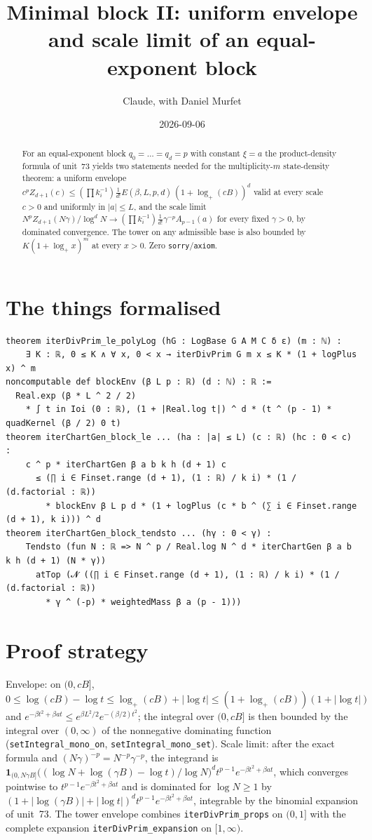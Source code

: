 \documentclass[11pt]{article}
\title{Minimal block II: uniform envelope and scale limit of an equal-exponent block}
\author{Claude, with Daniel Murfet}
\date{2026-09-06}
\begin{document}
\maketitle
\sloppy

\begin{abstract}
For an equal-exponent block $q_0=\dots=q_d=p$ with constant $\xi=a$ the product-density formula of
unit~73 yields two statements needed for the multiplicity-$m$ state-density theorem: a uniform envelope
$c^pZ_{d+1}(c)\le(\prod k_i^{-1})\frac1{d!}E(\beta,L,p,d)\,(1+\log_+(cB))^d$ valid at every scale
$c>0$ and uniformly in $|a|\le L$, and the scale limit
$N^pZ_{d+1}(N\gamma)/\log^dN\to(\prod k_i^{-1})\frac1{d!}\gamma^{-p}A_{p-1}(a)$ for every fixed
$\gamma>0$, by dominated convergence. The tower on any admissible base is also bounded by
$K(1+\log_+x)^m$ at every $x>0$. Zero \texttt{sorry}/\texttt{axiom}.
\end{abstract}

\section{The things formalised}
{\small
\begin{verbatim}
theorem iterDivPrim_le_polyLog (hG : LogBase G A M C δ ε) (m : ℕ) :
    ∃ K : ℝ, 0 ≤ K ∧ ∀ x, 0 < x → iterDivPrim G m x ≤ K * (1 + logPlus x) ^ m
noncomputable def blockEnv (β L p : ℝ) (d : ℕ) : ℝ :=
  Real.exp (β * L ^ 2 / 2)
    * ∫ t in Ioi (0 : ℝ), (1 + |Real.log t|) ^ d * (t ^ (p - 1) * quadKernel (β / 2) 0 t)
theorem iterChartGen_block_le ... (ha : |a| ≤ L) (c : ℝ) (hc : 0 < c) :
    c ^ p * iterChartGen β a b k h (d + 1) c
      ≤ (∏ i ∈ Finset.range (d + 1), (1 : ℝ) / k i) * (1 / (d.factorial : ℝ))
        * blockEnv β L p d * (1 + logPlus (c * b ^ (∑ i ∈ Finset.range (d + 1), k i))) ^ d
theorem iterChartGen_block_tendsto ... (hγ : 0 < γ) :
    Tendsto (fun N : ℝ => N ^ p / Real.log N ^ d * iterChartGen β a b k h (d + 1) (N * γ))
      atTop (𝓝 ((∏ i ∈ Finset.range (d + 1), (1 : ℝ) / k i) * (1 / (d.factorial : ℝ))
        * γ ^ (-p) * weightedMass β a (p - 1)))
\end{verbatim}
}

\section{Proof strategy}
Envelope: on $(0,cB]$, $0\le\log(cB)-\log t\le\log_+(cB)+|\log t|\le(1+\log_+(cB))(1+|\log t|)$ and
$e^{-\beta t^2+\beta at}\le e^{\beta L^2/2}e^{-(\beta/2)t^2}$; the integral over $(0,cB]$ is then
bounded by the integral over $(0,\infty)$ of the nonnegative dominating function
(\texttt{setIntegral\_mono\_on}, \texttt{setIntegral\_mono\_set}). Scale limit: after the exact
formula and $(N\gamma)^{-p}=N^{-p}\gamma^{-p}$, the integrand is
$\mathbf 1_{(0,N\gamma B]}\big((\log N+\log(\gamma B)-\log t)/\log N\big)^d t^{p-1}e^{-\beta t^2+\beta at}$,
which converges pointwise to $t^{p-1}e^{-\beta t^2+\beta at}$ and is dominated for $\log N\ge1$ by
$(1+|\log(\gamma B)|+|\log t|)^d t^{p-1}e^{-\beta t^2+\beta at}$, integrable by the binomial expansion
of unit~73. The tower envelope combines \texttt{iterDivPrim\_props} on $(0,1]$ with the complete
expansion \texttt{iterDivPrim\_expansion} on $[1,\infty)$.
\end{document}
